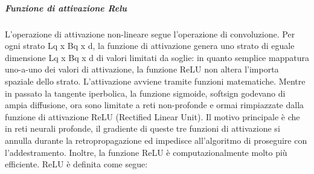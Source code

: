\documentclass[14pt]{extarticle}
\begin{document}

\subparagraph{Funzione di attivazione Relu}
L’operazione di attivazione non-lineare segue l’operazione di convoluzione. Per ogni
strato Lq x Bq x d, la funzione di attivazione genera uno strato di eguale dimensione
Lq x Bq x d di valori limitati da soglie: in quanto semplice mappatura uno-a-uno dei
valori di attivazione, la funzione ReLU non altera l’importa spaziale dello strato.
L’attivazione avviene tramite funzioni matematiche. Mentre in passato la tangente iperbolica, la funzione sigmoide, softsign godevano di ampia diffusione, ora sono
limitate a reti non-profonde e ormai rimpiazzate dalla funzione di attivazione ReLU
(Rectified Linear Unit). Il motivo principale è che in reti neurali profonde, il gradiente
di queste tre funzioni di attivazione si annulla durante la retropropagazione ed impedisce all’algoritmo di proseguire con l’addestramento. Inoltre, la funzione ReLU è
computazionalmente molto più efficiente. ReLU è definita come segue:
\end{document}
